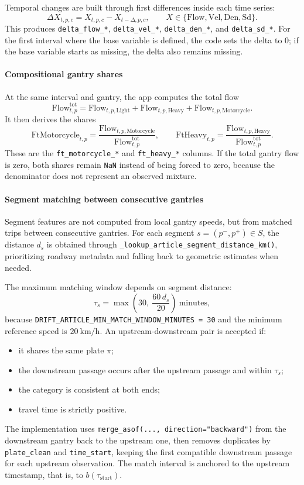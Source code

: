 Temporal changes are built through first differences inside each time series:
\[
\Delta X_{t,p,c} = X_{t,p,c} - X_{t-\Delta,p,c},
\qquad
X \in \{\mathrm{Flow}, \mathrm{Vel}, \mathrm{Den}, \mathrm{Sd}\}.
\]
This produces \texttt{delta\_flow\_*}, \texttt{delta\_vel\_*}, \texttt{delta\_den\_*}, and \texttt{delta\_sd\_*}. For the first interval where the base variable is defined, the code sets the delta to \(0\); if the base variable starts as missing, the delta also remains missing.

\paragraph{Compositional gantry shares}
At the same interval and gantry, the app computes the total flow
\[
\mathrm{Flow}^{\mathrm{tot}}_{t,p}
= \mathrm{Flow}_{t,p,\mathrm{Light}}
+ \mathrm{Flow}_{t,p,\mathrm{Heavy}}
+ \mathrm{Flow}_{t,p,\mathrm{Motorcycle}}.
\]
It then derives the shares
\[
\mathrm{FtMotorcycle}_{t,p} =
\frac{\mathrm{Flow}_{t,p,\mathrm{Motorcycle}}}{\mathrm{Flow}^{\mathrm{tot}}_{t,p}},
\qquad
\mathrm{FtHeavy}_{t,p} =
\frac{\mathrm{Flow}_{t,p,\mathrm{Heavy}}}{\mathrm{Flow}^{\mathrm{tot}}_{t,p}}.
\]
These are the \texttt{ft\_motorcycle\_*} and \texttt{ft\_heavy\_*} columns. If the total gantry flow is zero, both shares remain \texttt{NaN} instead of being forced to zero, because the denominator does not represent an observed mixture.

\paragraph{Segment matching between consecutive gantries}
Segment features are not computed from local gantry speeds, but from matched trips between consecutive gantries. For each segment \(s=(p^{-},p^{+}) \in S\), the distance \(d_s\) is obtained through \texttt{\_lookup\_article\_segment\_distance\_km()}, prioritizing roadway metadata and falling back to geometric estimates when needed.

The maximum matching window depends on segment distance:
\[
\tau_s = \max\left(30,\ \frac{60\,d_s}{20}\right)\ \text{minutes},
\]
because \texttt{DRIFT\_ARTICLE\_MIN\_MATCH\_WINDOW\_MINUTES = 30} and the minimum reference speed is \(20\ \mathrm{km/h}\). An upstream-downstream pair is accepted if:
\begin{itemize}[leftmargin=*]
  \item it shares the same plate \(\pi\);
  \item the downstream passage occurs after the upstream passage and within \(\tau_s\);
  \item the category is consistent at both ends;
  \item travel time is strictly positive.
\end{itemize}
The implementation uses \texttt{merge\_asof(..., direction="backward")} from the downstream gantry back to the upstream one, then removes duplicates by \texttt{plate\_clean} and \texttt{time\_start}, keeping the first compatible downstream passage for each upstream observation. The match interval is anchored to the upstream timestamp, that is, to \(b(\tau_{\mathrm{start}})\).

